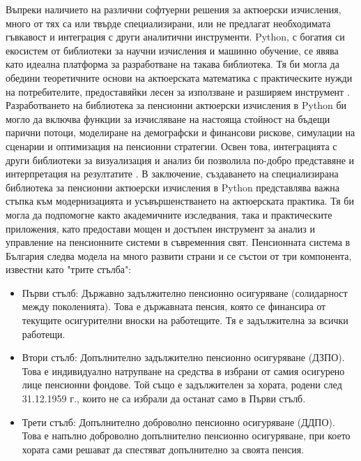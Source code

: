 \documentclass[a4paper,12pt]{article}
\begin{document}
\newline
\newline
Въпреки наличието на различни софтуерни решения за актюерски изчисления, много от тях са или твърде специализирани, или не предлагат необходимата гъвкавост и интеграция с други аналитични инструменти. Python, с богатия си екосистем от библиотеки за научни изчисления и машинно обучение, се явява като идеална платформа за разработване на такава библиотека. Тя би могла да обедини теоретичните основи на актюерската математика с практическите нужди на потребителите, предоставяйки лесен за използване и разширяем инструмент \cite{numpy2024, pandas2024}.
\newline
\newline
Разработването на библиотека за пенсионни актюерски изчисления в Python би могло да включва функции за изчисляване на настояща стойност на бъдещи парични потоци, моделиране на демографски и финансови рискове, симулации на сценарии и оптимизация на пенсионни стратегии. Освен това, интеграцията с други библиотеки за визуализация и анализ би позволила по-добро представяне и интерпретация на резултатите \cite{matplotlib2024, seaborn2024}.
\newline
\newline
В заключение, създаването на специализирана библиотека за пенсионни актюерски изчисления в Python представлява важна стъпка към модернизацията и усъвършенстването на актюерската практика. Тя би могла да подпомогне както академичните изследвания, така и практическите приложения, като предостави мощен и достъпен инструмент за анализ и управление на пенсионните системи в съвременния свят.
\newline
\newline
Пенсионната система в България следва модела на много развити страни и се състои
от три компонента, известни като "трите стълба":
\begin{itemize}
        \item Първи стълб: Държавно задължително пенсионно осигуряване (солидарност между поколенията). Това е държавната пенсия, която се финансира от текущите осигурителни вноски на работещите. Тя е задължителна за всички работещи.
        \item Втори стълб: Допълнително задължително пенсионно осигуряване (ДЗПО). Това е индивидуално натрупване на средства в избрани от самия осигурено лице пенсионни фондове. Той също е задължителен за хората, родени след 31.12.1959 г., които не са избрали да останат само в Първи стълб.
        \item Трети стълб: Допълнително доброволно пенсионно осигуряване (ДДПО). Това е напълно доброволно допълнително пенсионно осигуряване, при което хората сами решават да спестяват допълнително за своята пенсия.
\end{itemize}
\end{document}

